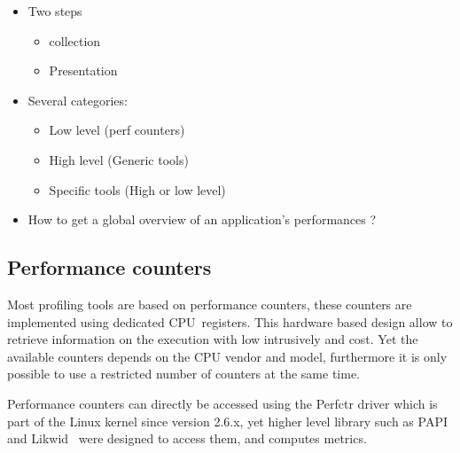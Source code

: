 \begin{itemize}
    \item Two steps
        \begin{itemize}
            \item collection
            \item Presentation
        \end{itemize}
    \item Several categories:
        \begin{itemize}
            \item Low level (perf counters)
            \item High level (Generic tools)
            \item Specific tools (High or low level)
        \end{itemize}
    \item How to get a global overview of an application's performances ?
\end{itemize}


\subsection{Performance counters}

Most profiling tools are based on performance counters, these counters are
implemented using dedicated \gls{CPU} registers. This hardware based design
allow to retrieve information on the execution with low intrusively and cost.
Yet the available counters depends on the \gls{CPU} vendor and model,
furthermore it is only possible to use a restricted number of counters at
the same time.

Performance counters can directly be accessed using the \gls{Perfctr}
driver which is part of the \gls{Linux} kernel since version
2.6.x, yet higher level library such as
\gls{PAPI}~\cite{Browne00Portable,Weaver13PAPI,Malony11Parallel} and
\gls{Likwid}~\cite{Treibig10LIKWID} were designed to access them, and computes
metrics. 

